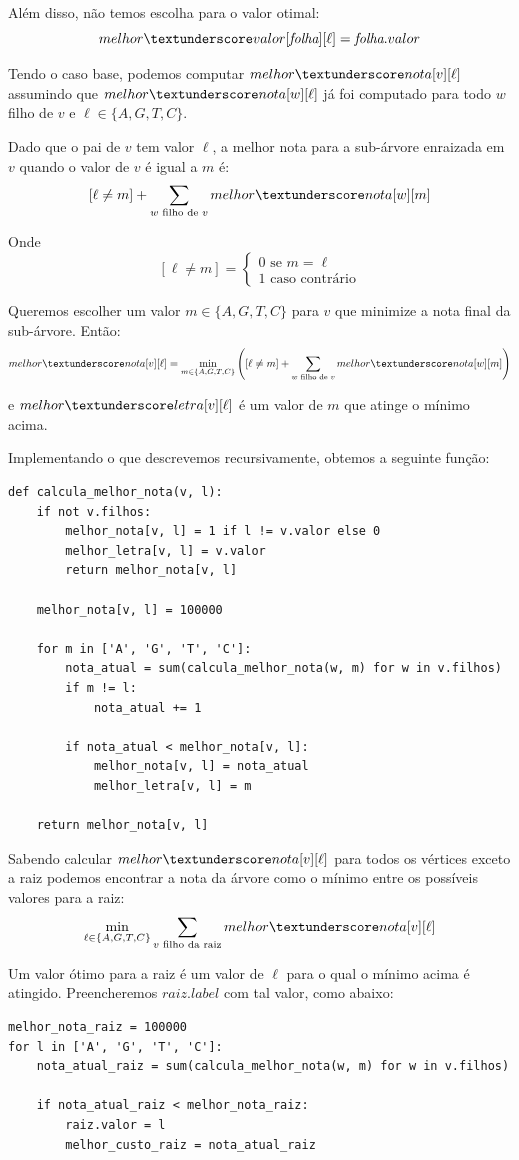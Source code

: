 \documentclass[11pt]{article}
\newcommand{\tu}{\textunderscore}
\begin{document}
Além disso, não temos escolha para o valor otimal:
\[ melhor \tu valor[\textit{folha}][\ell] = \textit{folha}.valor \]

Tendo o caso base, podemos computar $melhor \tu nota[v][\ell]$
assumindo que $melhor \tu nota[w][\ell]$ já foi computado para todo
$w$ filho de $v$ e $\ell \in \{A, G, T, C\}$.

Dado que o pai de $v$ tem valor $\ell$, a melhor nota para a
sub-árvore enraizada em $v$ quando o valor de $v$ é igual a $m$ é:
\[ [\ell \neq m] + \sum_{w \text{ filho de }v} melhor \tu nota[w][m]\]

Onde \[[\ell \neq m] =  \begin{cases} 0 \text{ se } m = \ell \\
                                      1 \text{ caso contrário}\end{cases}\]

Queremos escolher um valor $m \in \{A, G, T, C\}$ para $v$
que minimize a nota final da sub-árvore. Então:
\[melhor \tu nota[v][\ell] = \min_{m \in \{A, G, T, C\}} \left([\ell
\neq m] + \sum_{w \text{ filho de }v} melhor \tu nota[w][m]\right)\]

e $melhor\tu letra[v][\ell]$ é um valor de $m$ que atinge o mínimo
acima.

Implementando o que descrevemos recursivamente, obtemos a seguinte
função:
\begin{verbatim}
def calcula_melhor_nota(v, l):
    if not v.filhos:
        melhor_nota[v, l] = 1 if l != v.valor else 0
        melhor_letra[v, l] = v.valor
        return melhor_nota[v, l]

    melhor_nota[v, l] = 100000

    for m in ['A', 'G', 'T', 'C']:
        nota_atual = sum(calcula_melhor_nota(w, m) for w in v.filhos)
        if m != l:
            nota_atual += 1

        if nota_atual < melhor_nota[v, l]:
            melhor_nota[v, l] = nota_atual
            melhor_letra[v, l] = m

    return melhor_nota[v, l]
\end{verbatim}

Sabendo calcular $melhor \tu nota[v][\ell]$ para todos os vértices
exceto a raiz podemos encontrar a nota da árvore como o mínimo entre
os possíveis valores para a raiz:
\[ \min_{\ell \in \{A, G, T, C\}} \sum_{v \text{ filho da raiz}}
melhor \tu nota[v][\ell]\]

Um valor ótimo para a raiz é um valor de $\ell$ para o qual o mínimo
acima é atingido. Preencheremos $raiz.label$ com tal valor, como
abaixo:
\begin{verbatim}
melhor_nota_raiz = 100000
for l in ['A', 'G', 'T', 'C']:
    nota_atual_raiz = sum(calcula_melhor_nota(w, m) for w in v.filhos)

    if nota_atual_raiz < melhor_nota_raiz:
        raiz.valor = l
        melhor_custo_raiz = nota_atual_raiz
\end{verbatim}
\end{document}
